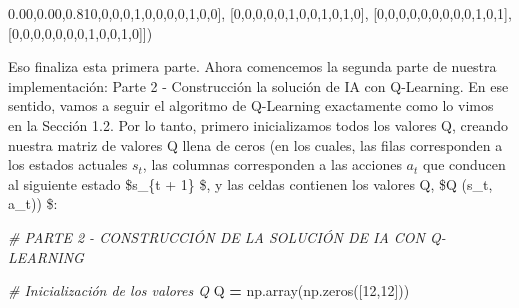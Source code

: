 \documentclass[]{book}
\newenvironment{Shaded}{\begin{snugshade}}{\end{snugshade}}
\newcommand{\CommentTok}[1]{\textcolor[rgb]{0.56,0.35,0.01}{\textit{#1}}}
\newcommand{\DecValTok}[1]{\textcolor[rgb]{0.00,0.00,0.81}{#1}}
\newcommand{\NormalTok}[1]{#1}
\newcommand{\OperatorTok}[1]{\textcolor[rgb]{0.81,0.36,0.00}{\textbf{#1}}}
\begin{document}
\begin{Shaded}
\begin{Highlighting}[]
\NormalTok{              [}\DecValTok{0}\NormalTok{,}\DecValTok{0}\NormalTok{,}\DecValTok{0}\NormalTok{,}\DecValTok{0}\NormalTok{,}\DecValTok{1}\NormalTok{,}\DecValTok{0}\NormalTok{,}\DecValTok{0}\NormalTok{,}\DecValTok{0}\NormalTok{,}\DecValTok{0}\NormalTok{,}\DecValTok{1}\NormalTok{,}\DecValTok{0}\NormalTok{,}\DecValTok{0}\NormalTok{],}
\NormalTok{              [}\DecValTok{0}\NormalTok{,}\DecValTok{0}\NormalTok{,}\DecValTok{0}\NormalTok{,}\DecValTok{0}\NormalTok{,}\DecValTok{0}\NormalTok{,}\DecValTok{1}\NormalTok{,}\DecValTok{0}\NormalTok{,}\DecValTok{0}\NormalTok{,}\DecValTok{1}\NormalTok{,}\DecValTok{0}\NormalTok{,}\DecValTok{1}\NormalTok{,}\DecValTok{0}\NormalTok{],}
\NormalTok{              [}\DecValTok{0}\NormalTok{,}\DecValTok{0}\NormalTok{,}\DecValTok{0}\NormalTok{,}\DecValTok{0}\NormalTok{,}\DecValTok{0}\NormalTok{,}\DecValTok{0}\NormalTok{,}\DecValTok{0}\NormalTok{,}\DecValTok{0}\NormalTok{,}\DecValTok{0}\NormalTok{,}\DecValTok{1}\NormalTok{,}\DecValTok{0}\NormalTok{,}\DecValTok{1}\NormalTok{],}
\NormalTok{              [}\DecValTok{0}\NormalTok{,}\DecValTok{0}\NormalTok{,}\DecValTok{0}\NormalTok{,}\DecValTok{0}\NormalTok{,}\DecValTok{0}\NormalTok{,}\DecValTok{0}\NormalTok{,}\DecValTok{0}\NormalTok{,}\DecValTok{1}\NormalTok{,}\DecValTok{0}\NormalTok{,}\DecValTok{0}\NormalTok{,}\DecValTok{1}\NormalTok{,}\DecValTok{0}\NormalTok{]])}
\end{Highlighting}
\end{Shaded}

Eso finaliza esta primera parte. Ahora comencemos la segunda parte de nuestra implementación: Parte 2 - Construcción la solución de IA con Q-Learning. En ese sentido, vamos a seguir el algoritmo de Q-Learning exactamente como lo vimos en la Sección 1.2. Por lo tanto, primero inicializamos todos los valores Q, creando nuestra matriz de valores Q llena de ceros (en los cuales, las filas corresponden a los estados actuales \(s_t\), las columnas corresponden a las acciones \(a_t\) que conducen al siguiente estado \$s\_\{t + 1\} \$, y las celdas contienen los valores Q, \$Q (s\_t, a\_t)) \$:

\begin{Shaded}
\begin{Highlighting}[]
\CommentTok{# PARTE 2 - CONSTRUCCIÓN DE LA SOLUCIÓN DE IA CON Q-LEARNING}

\CommentTok{# Inicialización de los valores Q}
\NormalTok{Q }\OperatorTok{=}\NormalTok{ np.array(np.zeros([}\DecValTok{12}\NormalTok{,}\DecValTok{12}\NormalTok{]))}
\end{Highlighting}
\end{Shaded}
\end{document}

